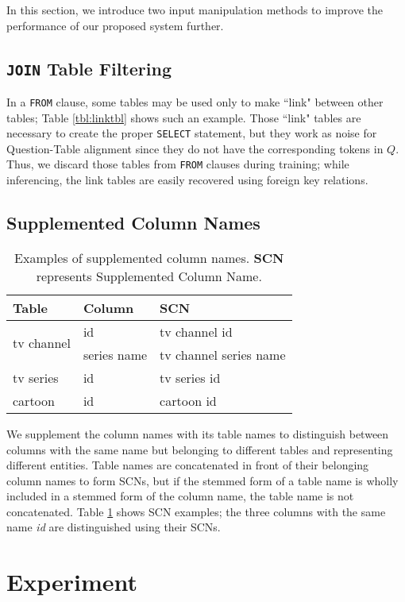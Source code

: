 \documentclass[11pt,a4paper]{article}
\begin{document}
In this section, we introduce two input manipulation methods to improve the performance of our proposed system further.

\subsection{\texttt{JOIN} Table Filtering}
In a \texttt{FROM} clause, some tables may be used only to make ``link" between other tables; Table \ref{tbl:linktbl} shows such an example. Those ``link" tables are necessary to create the proper \texttt{SELECT} statement, but they work as noise for Question-Table alignment since they do not have the corresponding tokens in $Q$. Thus, we discard those tables from \texttt{FROM} clauses during training; while inferencing, the link tables are easily recovered using foreign key relations.
 

\subsection{Supplemented Column Names}

\begin{table}
\centering
\begin{tabular}{|l|l|l|}\hline
\textbf{Table}&\textbf{Column}&\textbf{SCN} \\ \hline
\multirow{2}{*}{tv channel} & id & tv channel id \\ \cline{2-3}
& series name & tv channel series name \\ \hline
tv series & id & tv series id \\ \hline
cartoon & id & cartoon id \\ \hline
\end{tabular}
\caption{Examples of supplemented column names. \textbf{SCN} represents Supplemented Column Name.}
\label{tbl:scn}
\end{table}

We supplement the column names with its table names to distinguish between columns with the same name but belonging to different tables and representing different entities. Table names are concatenated in front of their belonging column names to form SCNs, but if the stemmed form of a table name is wholly included in a stemmed form of the column name, the table name is not concatenated.  Table \ref{tbl:scn} shows SCN examples; the three columns with the same name \textit{id} are distinguished using their SCNs.

 \section{Experiment}
\end{document}
